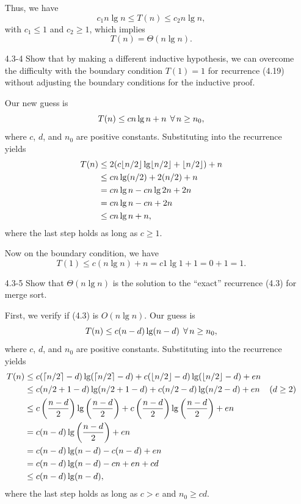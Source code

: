 \begin{enumerate}
\begin{framed}
Thus, we have
\[
c_1 n \lg n \le T(n) \le c_2 n \lg n,
\]
with $c_1 \le 1$ and $c_2 \ge 1$, which implies
\[
T(n) = \Theta(n \lg n).
\]
\end{framed}

\newpage

\item[4.3{-}4]{Show that by making a different inductive hypothesis, we can
overcome the difficulty with the boundary condition $T(1) = 1$ for recurrence
(4.19) without adjusting the boundary conditions for the inductive proof.}

\begin{framed}
Our new guess is
\[
T(n) \le c n \lg n + n \; \operatorname{\forall} n \ge n_0,
\]
where $c$, $d$, and $n_0$ are positive constants. Substituting into the
recurrence yields
\begin{equation*}
\begin{aligned}
T(n) &\le 2(c \lfloor n/2\rfloor \lg \lfloor n/2\rfloor + \lfloor n/2\rfloor) + n\\
     &\le cn \lg (n/2) + 2(n/2) + n\\
     &= cn \lg n - cn \lg 2 n + 2n\\
     &= cn \lg n - cn + 2n\\
     &\le c n \lg n + n,
\end{aligned}
\end{equation*}
where the last step holds as long as $c \ge 1$.

Now on the boundary condition, we have
\[
T(1) \le c (n \lg n) + n = c 1 \lg 1 + 1 = 0 + 1 = 1.
\]
\end{framed}

\item[4.3{-}5]{Show that $\Theta(n \lg n)$ is the solution to the ``exact''
recurrence (4.3) for merge sort.}

\begin{framed}
First, we verify if (4.3) is $O(n \lg n)$. Our guess is
\[
T(n) \le c (n - d) \lg (n - d) \; \operatorname{\forall} n \ge n_0,
\]
where $c$, $d$, and $n_0$ are positive constants. Substituting into the
recurrence yields
\begin{equation*}
\begin{aligned}
T(n) &\le c (\lceil n/2\rceil - d) \lg (\lceil n/2\rceil - d) + c (\lfloor n/2\rfloor - d) \lg (\lfloor n/2\rfloor - d) + en\\
     &\le c (n/2 + 1 - d) \lg (n/2 + 1 - d) + c (n/2 - d) \lg (n/2 - d) + en & \text{($d \ge 2$)}\\
     &\le c\left(\frac{n - d}{2}\right) \lg \left(\frac{n - d}{2}\right)
     + c\left(\frac{n - d}{2}\right) \lg\left(\frac{n - d}{2}\right) + en\\
     &= c (n - d) \lg \left(\frac{n - d}{2}\right) + en\\
     &= c (n - d) \lg (n - d) - c (n - d) + en\\
     &= c (n - d) \lg (n - d) - cn + en + cd\\
     &\le c (n - d) \lg (n - d),
\end{aligned}
\end{equation*}
where the last step holds as long as $c > e$ and $n_0 \ge cd$.


\end{framed}
\end{enumerate}
